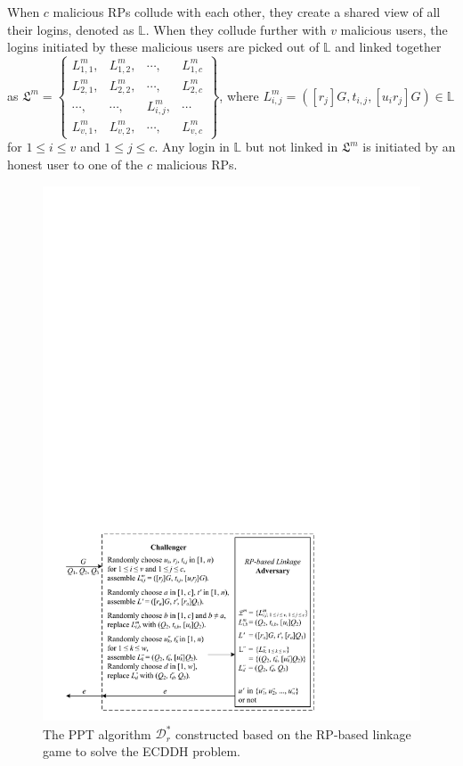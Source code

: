 When $c$ malicious RPs collude with each other, they create a shared view of all their logins, denoted as $\mathbb{L}$.
When they collude further with $v$ malicious users, the logins initiated by these malicious users are picked out of $\mathbb{L}$ and linked together as
$\mathfrak{L}^m=\left \{ \begin{matrix}
L^m_{1,1},&L^m_{1,2},&\cdots,&L^m_{1,c}\\
L^m_{2,1},& L^m_{2,2},&\cdots,&L^m_{2,c}\\
\cdots,&\cdots,&L^m_{i,j},&\cdots\\
L^m_{v,1},&L^m_{v,2},&\cdots,&L^m_{v,c}
\end{matrix}\right\}$,
where $L^m_{i, j}=([r_j]G, t_{i,j}, [u_ir_j]G) \in \mathbb{L}$ for $1 \le i \le v$ and $1 \le j \le c$. Any login in $\mathbb{L}$ but not linked in $\mathfrak{L}^m$ is initiated by an honest user to one of the $c$ malicious RPs.

\begin{figure}[tb]
  \centering
  \includegraphics[width=1.0\linewidth]{fig/rp-linkage-game.pdf}
  \caption{The PPT algorithm $\mathcal{D}^*_r$ constructed based on the RP-based linkage game to solve the ECDDH problem.}
  \label{fig:dalgorithm}
\end{figure}


